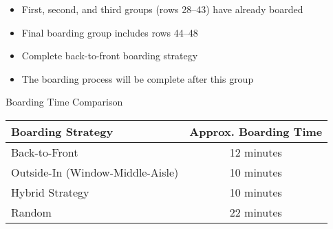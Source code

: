 \documentclass{article}
\begin{document}
\begin{itemize}
  \item First, second, and third groups (rows 28--43) have already boarded
  \item Final boarding group includes rows 44--48
  \item Complete back-to-front boarding strategy
  \item The boarding process will be complete after this group
\end{itemize}

\begin{center}
  \Large Boarding Time Comparison
\end{center}

\begin{tabular}{|l|c|}
  \hline
  \textbf{Boarding Strategy} & \textbf{Approx. Boarding Time} \\
  \hline
  Back-to-Front & 12 minutes \\
  Outside-In (Window-Middle-Aisle) & 10 minutes \\
  Hybrid Strategy & 10 minutes \\
  Random & 22 minutes \\
  \hline
\end{tabular}
\end{document}
